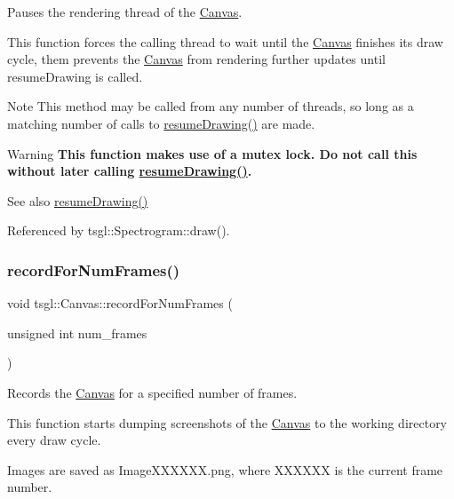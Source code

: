 Pauses the rendering thread of the \hyperlink{classtsgl_1_1_canvas}{Canvas}. 

This function forces the calling thread to wait until the \hyperlink{classtsgl_1_1_canvas}{Canvas} finishes its draw cycle, them prevents the \hyperlink{classtsgl_1_1_canvas}{Canvas} from rendering further updates until resume\+Drawing is called. \begin{DoxyNote}{Note}
This method may be called from any number of threads, so long as a matching number of calls to \hyperlink{classtsgl_1_1_canvas_a56bf3c6e4eb7b06015d1c115aaa143f8}{resume\+Drawing()} are made. 
\end{DoxyNote}
\begin{DoxyWarning}{Warning}
{\bfseries This function makes use of a mutex lock. Do not call this without later calling \hyperlink{classtsgl_1_1_canvas_a56bf3c6e4eb7b06015d1c115aaa143f8}{resume\+Drawing()}.} 
\end{DoxyWarning}
\begin{DoxySeeAlso}{See also}
\hyperlink{classtsgl_1_1_canvas_a56bf3c6e4eb7b06015d1c115aaa143f8}{resume\+Drawing()} 
\end{DoxySeeAlso}


Referenced by tsgl\+::\+Spectrogram\+::draw().

\mbox{\label{classtsgl_1_1_canvas_a47436daa39473ddb4044bac7b3b27151}} 
\subsubsection{\texorpdfstring{record\+For\+Num\+Frames()}{recordForNumFrames()}}
{\footnotesize\ttfamily void tsgl\+::\+Canvas\+::record\+For\+Num\+Frames (\begin{DoxyParamCaption}\item[{unsigned int}]{num\+\_\+frames }\end{DoxyParamCaption})}



Records the \hyperlink{classtsgl_1_1_canvas}{Canvas} for a specified number of frames. 

This function starts dumping screenshots of the \hyperlink{classtsgl_1_1_canvas}{Canvas} to the working directory every draw cycle.

Images are saved as Image\+X\+X\+X\+X\+X\+X.\+png, where X\+X\+X\+X\+XX is the current frame number.

